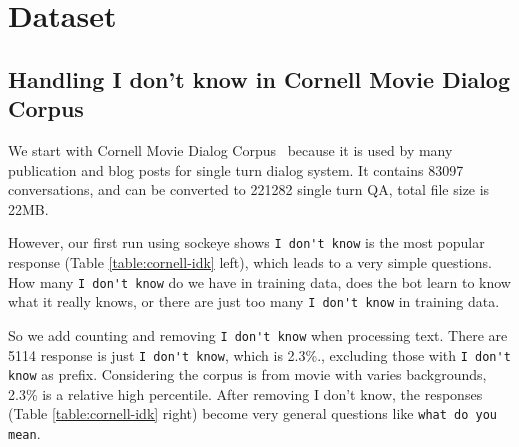 \documentclass{article}
\begin{document}
\section{Dataset}
\label{sec:dataset}

\subsection{Handling I don't know in Cornell Movie Dialog Corpus}
\label{subsec:idk}

We start with Cornell Movie Dialog Corpus~\cite{data:cornell} because it is used by many publication and blog posts for single turn dialog system.
It contains 83097 conversations, and can be converted to 221282 single turn QA, total file size is 22MB.

However, our first run using sockeye shows \verb+I don't know+ is the most popular response (Table \ref{table:cornell-idk} left),
which leads to a very simple questions. How many \verb+I don't know+ do we have in training data,
does the bot learn to know what it really knows, or there are just too many \verb+I don't know+ in training data.

So we add counting and removing \verb+I don't know+ when processing text.
There are 5114 response is just \verb+I don't know+, which is 2.3\%., excluding those with \verb+I don't know+ as prefix.
Considering the corpus is from movie with varies backgrounds, 2.3\% is a relative high percentile.
After removing I don't know, the responses (Table \ref{table:cornell-idk} right) become very general questions like \verb+what do you mean+.
\end{document}
